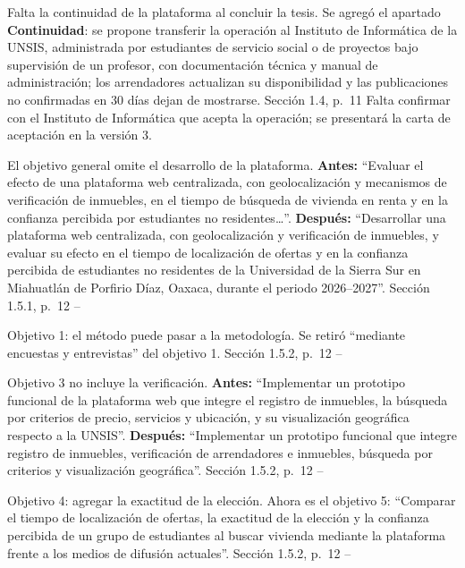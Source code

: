 \documentclass[10pt]{article}
\begin{document}
\begin{matriz}
  {Falta la continuidad de la plataforma al concluir la tesis.}
  {Se agregó el apartado \textbf{Continuidad}: se propone transferir la operación al Instituto de Informática de la UNSIS, administrada por estudiantes de servicio social o de proyectos bajo supervisión de un profesor, con documentación técnica y manual de administración; los arrendadores actualizan su disponibilidad y las publicaciones no confirmadas en 30 días dejan de mostrarse.}
  {Sección 1.4, p.~11}
  {\Parcial}
  {Falta confirmar con el Instituto de Informática que acepta la operación; se presentará la carta de aceptación en la versión 3.}
  {}

  {El objetivo general omite el desarrollo de la plataforma.}
  {\textbf{Antes:} ``Evaluar el efecto de una plataforma web centralizada, con geolocalización y mecanismos de verificación de inmuebles, en el tiempo de búsqueda de vivienda en renta y en la confianza percibida por estudiantes no residentes\ldots''.\newline
   \textbf{Después:} ``Desarrollar una plataforma web centralizada, con geolocalización y verificación de inmuebles, y evaluar su efecto en el tiempo de localización de ofertas y en la confianza percibida de estudiantes no residentes de la Universidad de la Sierra Sur en Miahuatlán de Porfirio Díaz, Oaxaca, durante el periodo 2026--2027''.}
  {Sección 1.5.1, p.~12}
  {\Atendida}{--}{}

  {Objetivo 1: el método puede pasar a la metodología.}
  {Se retiró ``mediante encuestas y entrevistas'' del objetivo 1.}
  {Sección 1.5.2, p.~12}
  {\Atendida}{--}{}

  {Objetivo 3 no incluye la verificación.}
  {\textbf{Antes:} ``Implementar un prototipo funcional de la plataforma web que integre el registro de inmuebles, la búsqueda por criterios de precio, servicios y ubicación, y su visualización geográfica respecto a la UNSIS''.\newline
   \textbf{Después:} ``Implementar un prototipo funcional que integre registro de inmuebles, verificación de arrendadores e inmuebles, búsqueda por criterios y visualización geográfica''.}
  {Sección 1.5.2, p.~12}
  {\Atendida}{--}{}

  {Objetivo 4: agregar la exactitud de la elección.}
  {Ahora es el objetivo 5: ``Comparar el tiempo de localización de ofertas, la exactitud de la elección y la confianza percibida de un grupo de estudiantes al buscar vivienda mediante la plataforma frente a los medios de difusión actuales''.}
  {Sección 1.5.2, p.~12}
  {\Atendida}{--}{}


\end{matriz}
\end{document}
